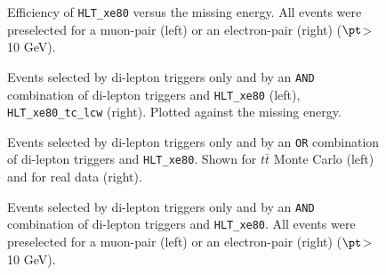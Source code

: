 \begin{figure}[h!]
\centering
{}
\caption{Efficiency of \texttt{HLT\_xe80} versus the missing energy. All events were preselected for a muon-pair (left) or an electron-pair (right) ($\pt$> 10 GeV).}
\label{fig:eff_trigger3}
\end{figure}

\begin{figure}[h!]
\centering
{}
\caption{Events selected by di-lepton triggers only and by an \texttt{AND} combination of di-lepton triggers and \texttt{HLT\_xe80} (left), \texttt{HLT\_xe80\_tc\_lcw} (right). Plotted against the missing energy.}
\label{fig:ev_trigger1}
\end{figure}

\begin{figure}[h!]
\centering
{}
\caption{Events selected by di-lepton triggers only and by an \texttt{OR} combination of di-lepton triggers and \texttt{HLT\_xe80}. Shown for $t\bar{t}$ Monte Carlo (left) and for real data (right).}
\label{fig:ev_trigger2}
\end{figure}

\begin{figure}[h!]
\centering
{}
\caption{Events selected by di-lepton triggers only and by an \texttt{AND} combination of di-lepton triggers and \texttt{HLT\_xe80}. All events were preselected for a muon-pair (left) or an electron-pair (right) ($\pt$> 10 GeV). }
\label{fig:ev_trigger3}
\end{figure}


